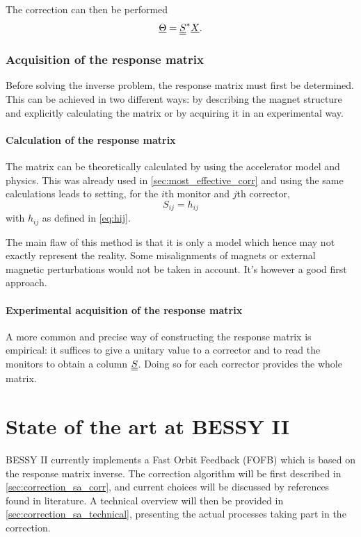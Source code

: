 The correction can then be performed
\begin{equation}
\underline{\Theta} = \underline{\underline{S}}^* \underline{X}.
\end{equation}

\subsubsection{Acquisition of the response matrix}
Before solving the inverse problem, the response matrix must first be determined. This can be achieved in two different ways: by describing the magnet structure and explicitly calculating the matrix or by acquiring it in an experimental way.

\paragraph{Calculation of the response matrix}
The matrix can be theoretically calculated by using the accelerator model and physics. This was already used in \cref{sec:most_effective_corr} and using the same calculations leads to setting, for the $i$th monitor and $j$th corrector,
\begin{equation}
S_{ij} = h_{ij}
\end{equation}
with $h_{ij}$ as defined in \cref{eq:hij}.

The main flaw of this method is that it is only a model which hence may not exactly represent the reality. Some misalignments of magnets or external magnetic perturbations would not be taken in account. It's however a good first approach.

\paragraph{Experimental acquisition of the response matrix}
A more common and precise way of constructing the response matrix is empirical: it suffices to give a unitary value to a corrector and to read the monitors to obtain a column $\underline{\underline{S}}$. Doing so for each corrector provides the whole matrix.


\section{State of the art at BESSY II}
\label{sec:correction_state_of_art}
BESSY II currently implements a Fast Orbit Feedback (FOFB) which is based on the response matrix inverse. The correction algorithm will be first described in \cref{sec:correction_sa_corr}, and current choices will be discussed by references found in literature. A technical overview will then be provided in \cref{sec:correction_sa_technical}, presenting the actual processes taking part in the correction.

